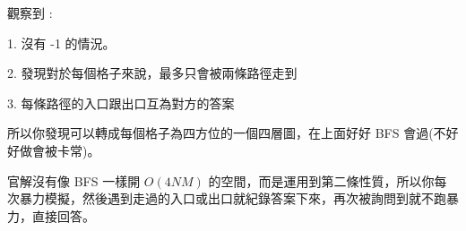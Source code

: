 \begin{frame}{}
    觀察到 :

    \begin{property}
        1. 沒有 -1 的情況。

        2. 發現對於每個格子來說，最多只會被兩條路徑走到

        3. 每條路徑的入口跟出口互為對方的答案
    \end{property}

    所以你發現可以轉成每個格子為四方位的一個四層圖，在上面好好 BFS 會過(不好好做會被卡常)。

    官解沒有像 BFS 一樣開 $O(4NM)$ 的空間，而是運用到第二條性質，所以你每次暴力模擬，然後遇到走過的入口或出口就紀錄答案下來，再次被詢問到就不跑暴力，直接回答。
\end{frame}

